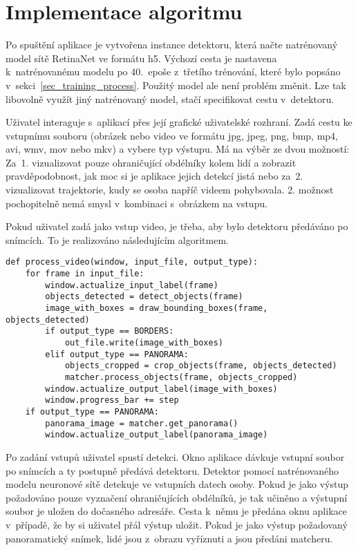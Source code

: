 \section{Implementace algoritmu}
\label{sec_identification}

Po spuštění aplikace je vytvořena instance detektoru, která načte natrénovaný model sítě RetinaNet ve formátu h5. Výchozí cesta je nastavena k~natrénovanému modelu po 40.~epoše z~třetího trénování, které bylo popsáno v~sekci~\ref{sec_training_process}. Použitý model ale není problém změnit. Lze tak libovolně využít jiný natrénovaný model, stačí specifikovat cestu v~detektoru.

Uživatel interaguje s~aplikací přes její grafické uživatelské rozhraní. Zadá cestu ke vstupnímu souboru (obrázek nebo video ve formátu jpg, jpeg, png, bmp, mp4, avi, wmv, mov nebo mkv) a vybere typ výstupu. Má na výběr ze dvou možností: Za~1. vizualizovat pouze ohraničující obdélníky kolem lidí a zobrazit pravděpodobnost, jak moc si je aplikace jejich detekcí jistá nebo za~2. vizualizovat trajektorie, kudy se osoba napříč videem pohybovala. 2. možnost pochopitelně nemá smysl v~kombinaci s~obrázkem na vstupu.

Pokud uživatel zadá jako vstup video, je třeba, aby bylo detektoru předáváno po snímcích. To je realizováno následujícím algoritmem.

\begin{minipage}{\linewidth}
    \bigskip
    \begin{lstlisting}
def process_video(window, input_file, output_type):
    for frame in input_file:
        window.actualize_input_label(frame)
        objects_detected = detect_objects(frame)
        image_with_boxes = draw_bounding_boxes(frame, objects_detected)
        if output_type == BORDERS:
            out_file.write(image_with_boxes)
        elif output_type == PANORAMA:
            objects_cropped = crop_objects(frame, objects_detected)
            matcher.process_objects(frame, objects_cropped)
        window.actualize_output_label(image_with_boxes)
        window.progress_bar += step
    if output_type == PANORAMA:
        panorama_image = matcher.get_panorama()
        window.actualize_output_label(panorama_image)
    \end{lstlisting}
\end{minipage}

Po zadání vstupů uživatel spustí detekci. Okno aplikace dávkuje vstupní soubor po snímcích a ty postupně předává detektoru. Detektor pomocí natrénovaného modelu neuronové sítě detekuje ve vstupních datech osoby. Pokud je jako výstup požadováno pouze vyznačení ohraničujících obdélníků, je tak učiněno a výstupní soubor je uložen do dočasného adresáře. Cesta k~němu je předána oknu aplikace v~případě, že by si uživatel přál výstup uložit. Pokud je jako výstup požadovaný panoramatický snímek, lidé jsou z~obrazu vyříznuti a jsou předáni matcheru.

